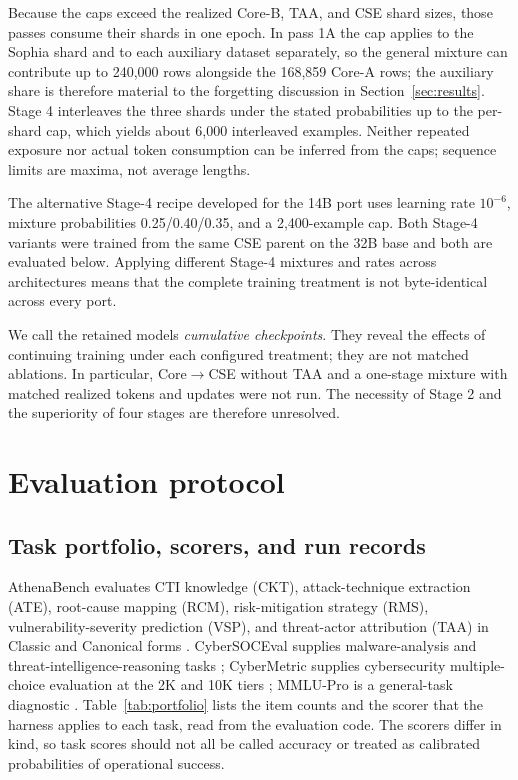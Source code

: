 \documentclass[preprint,12pt,authoryear]{elsarticle}
\begin{document}
Because the caps exceed the realized Core-B, TAA, and CSE shard sizes, those passes consume their shards in one epoch. In pass 1A the cap applies to the Sophia shard and to each auxiliary dataset separately, so the general mixture can contribute up to 240,000 rows alongside the 168,859 Core-A rows; the auxiliary share is therefore material to the forgetting discussion in Section~\ref{sec:results}. Stage 4 interleaves the three shards under the stated probabilities up to the per-shard cap, which yields about 6,000 interleaved examples. Neither repeated exposure nor actual token consumption can be inferred from the caps; sequence limits are maxima, not average lengths.

The alternative Stage-4 recipe developed for the 14B port uses learning rate $10^{-6}$, mixture probabilities 0.25/0.40/0.35, and a 2,400-example cap. Both Stage-4 variants were trained from the same CSE parent on the 32B base and both are evaluated below. Applying different Stage-4 mixtures and rates across architectures means that the complete training treatment is not byte-identical across every port.

We call the retained models \emph{cumulative checkpoints}. They reveal the effects of continuing training under each configured treatment; they are not matched ablations. In particular, Core$\rightarrow$CSE without TAA and a one-stage mixture with matched realized tokens and updates were not run. The necessity of Stage 2 and the superiority of four stages are therefore unresolved.

\section{Evaluation protocol}\label{sec:evaluation}
\subsection{Task portfolio, scorers, and run records}
AthenaBench evaluates CTI knowledge (CKT), attack-technique extraction (ATE), root-cause mapping (RCM), risk-mitigation strategy (RMS), vulnerability-severity prediction (VSP), and threat-actor attribution (TAA) in Classic and Canonical forms \citep{alam2025athenabench}. CyberSOCEval supplies malware-analysis and threat-intelligence-reasoning tasks \citep{deason2025cybersoceval}; CyberMetric supplies cybersecurity multiple-choice evaluation at the 2K and 10K tiers \citep{tihanyi2024cybermetric}; MMLU-Pro is a general-task diagnostic \citep{wang2024mmlupro}. Table~\ref{tab:portfolio} lists the item counts and the scorer that the harness applies to each task, read from the evaluation code. The scorers differ in kind, so task scores should not all be called accuracy or treated as calibrated probabilities of operational success.
\end{document}
